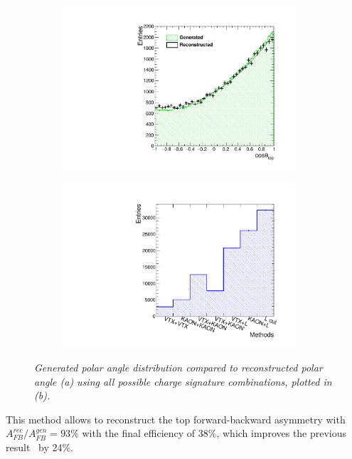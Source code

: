 \begin{figure}[h]
	\centering
	\begin{subfigure}{0.5\textwidth}
		\includegraphics[width=0.95\textwidth]{ILD/plots/top-asymmetry-lepton.pdf}
		\caption{\label{fig:TopAsymmetryChi_a_3} }
	\end{subfigure}%
	\begin{subfigure}{0.5\textwidth}
		\centering
		\includegraphics[width=0.95\textwidth]{ILD/plots/top-methods-lepton.pdf}
		\caption{\label{fig:TopAsymmetryChi_b_3} }
	\end{subfigure}
	\caption{\sl Generated polar angle distribution compared to reconstructed polar angle (a) using all possible charge signature combinations, plotted in (b). }
	\label{fig:TopAsymmetryChi_3}
\end{figure}

This method allows to reconstruct the top forward-backward asymmetry with $A_{FB}^{rec}/A^{gen}_{FB} = 93\%$ with the final efficiency of 38\%, which improves the previous result~\cite{bib:ILCTOP} by 24\%. 

